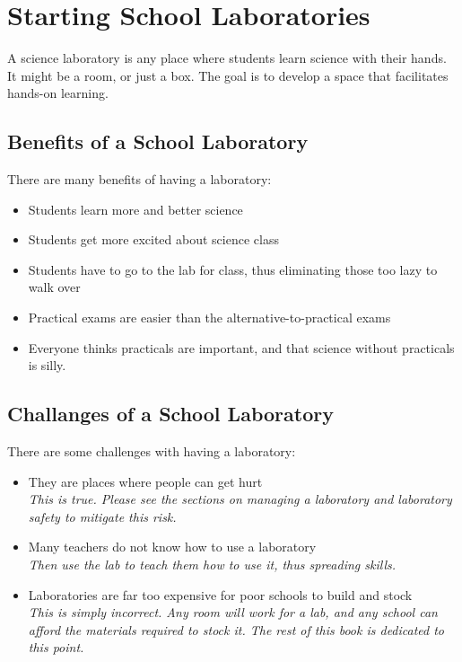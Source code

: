 \chapter{Starting School Laboratories}

A science laboratory is any place 
where students learn science with their hands. 
It might be a room, 
or just a box. 
The goal is to develop a space that facilitates hands-on learning.

\section{Benefits of a School Laboratory}
There are many benefits of having a laboratory:
\begin{itemize}
\item{Students learn more and better science}
\item{Students get more excited about science class}
\item{Students have to go to the lab for class, 
thus eliminating those too lazy to walk over}
\item{Practical exams are easier than the alternative-to-practical exams}
\item{Everyone thinks practicals are important, 
and that science without practicals is silly.}
\end{itemize}

\section{Challanges of a School Laboratory}
There are some challenges with having a laboratory:
\begin{itemize}
\item{They are places where people can get hurt\\
\textit{This is true. 
Please see the sections on managing a laboratory and laboratory safety 
to mitigate this risk.}}
\item{Many teachers do not know how to use a laboratory\\
\textit{Then use the lab to teach them how to use it, thus spreading skills.}}
\item{Laboratories are far too expensive for poor schools to build and stock\\
\textit{This is simply incorrect. 
Any room will work for a lab, 
and any school can afford the materials required to stock it. 
The rest of this book is dedicated to this point.}}
\end{itemize}

